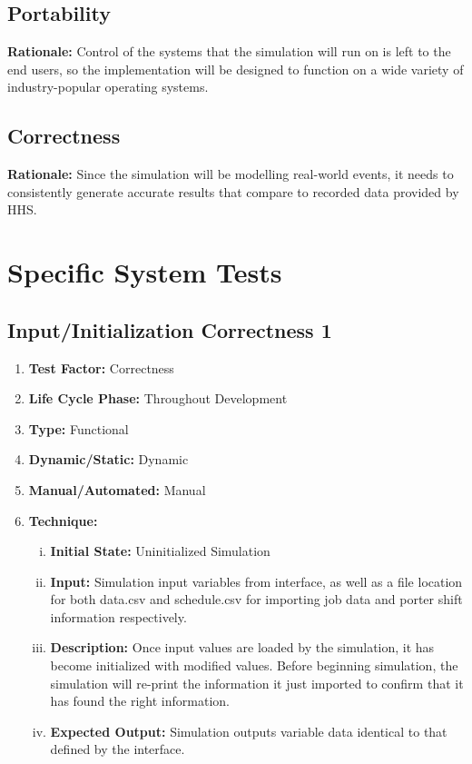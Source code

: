 \documentclass[paper=letter, fontsize=10pt]{scrartcl}
\numberwithin{equation}{section}		%
\numberwithin{figure}{section}			%
\numberwithin{table}{section}				%
\begin{document}
\subsection{Portability} 
\textbf{Rationale:} Control of the systems that the simulation will run on is left to the end users, so the implementation will be designed to function on a wide variety of industry-popular operating systems.
\subsection{Correctness}
\textbf{Rationale:} Since the simulation will be modelling real-world events, it needs to consistently generate accurate results that compare to recorded data provided by HHS.  

\section{Specific System Tests}
\subsection{Input/Initialization Correctness 1}
\begin{enumerate}[]
	\item \textbf{Test Factor:} Correctness  
	\item \textbf{Life Cycle Phase:} Throughout Development
	\item \textbf{Type:} Functional
	\item \textbf{Dynamic/Static:} Dynamic
	\item \textbf{Manual/Automated:} Manual
	\item \textbf{Technique:}
		\begin{enumerate}[(i)]
			\item \textbf{Initial State:} Uninitialized Simulation   
			\item \textbf{Input:} Simulation input variables from interface, as well as a file location for both data.csv and schedule.csv for importing job data and porter shift information respectively.
			\item \textbf{Description:} Once input values are loaded by the simulation, it has become initialized with modified values. Before beginning simulation, the simulation will re-print the information it just imported to confirm that it has found the right information.
			\item \textbf{Expected Output:} Simulation outputs variable data identical to that defined by the interface.
		\end{enumerate}
\end{enumerate}
\end{document}
